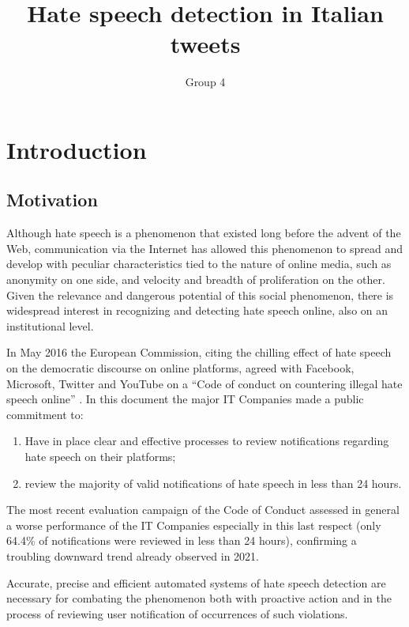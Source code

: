 \documentclass[a4paper, 9pt, twocolumn, DIV=calc]{scrartcl}
\begin{document}
\author{Group 4}
\title{Hate speech detection in Italian tweets}
\date{}

\maketitle
\section{Introduction}
\subsection{Motivation}
Although hate speech is a phenomenon that existed long before the advent of the Web, communication via the Internet has allowed this phenomenon to spread and develop with peculiar characteristics tied to the nature of online media, such as anonymity on one side, and velocity and breadth of proliferation on the other. Given the relevance and dangerous potential of this social phenomenon, there is widespread interest in recognizing and detecting hate speech online, also on an institutional level.

In May 2016 the European Commission, citing the chilling effect of hate speech on the democratic discourse on online platforms,  agreed with Facebook, Microsoft, Twitter and YouTube on a ``Code of conduct on countering illegal hate speech online'' \cite{european_commission_code}.
In this document the major IT Companies made a public commitment to:
\begin{enumerate}
  \item Have in place clear and effective processes to review notifications regarding hate speech on their platforms;
  \item review the majority of valid notifications of hate speech in less than 24 hours.
\end{enumerate}

The most recent evaluation campaign of the Code of Conduct \cite{reynders_factsheet} assessed in general a worse performance of the IT Companies especially in this last respect (only 64.4\% of notifications were reviewed in less than 24 hours), confirming a troubling downward trend already observed in 2021.

Accurate, precise and efficient automated systems of hate speech detection are necessary for combating the phenomenon both with proactive action and in the process of reviewing user notification of occurrences of such violations.
\end{document}
